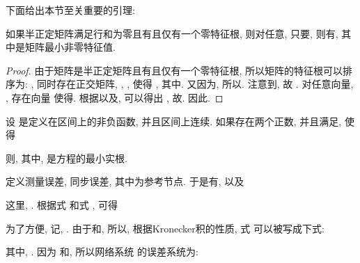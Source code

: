     下面给出本节至关重要的引理:
        \begin{lem}\label{mainlemma}
            如果半正定矩阵满足行和为零且有且仅有一个零特征根, 则对任意, 只要, 则有, 其中是矩阵最小非零特征值.
        \end{lem}
        \begin{proof}
        由于矩阵是半正定矩阵且有且仅有一个零特征根, 所以矩阵的特征根可以排序为: , 同时存在正交矩阵, , , 使得
        , 其中. 又因为, 所以. 注意到, 故 . 对任意向量, , 存在向量 使得. 根据以及, 可以得出 , 故. 因此.
        \end{proof}
        \begin{lem}[Halanay不等式]{\rm{}}\label{Halanay}
            设 是定义在区间上的非负函数, 并且区间上连续.
            如果存在两个正数, 并且满足, 使得

            则,
            其中, 是方程的最小实根.
        \end{lem}
        定义测量误差, 同步误差, 其中为参考节点.
        于是有, 以及
        \begin{comment}\label{reference}
        s(t)-s(t_k)&=\frac{1}{N}(\mathbf{1}^\top_N\otimes I_n)(x(t)-x(t_k))
        =-\frac{1}{N}(\mathbf{1}_N^\top\otimes I_n)\delta(t),
        \end{comment}
        这里, . 根据式  和式 , 可得
        \begin{comment}
        {u}_i(t)&=-\rho c\beta_i(t)\Gamma(x_i(t_k)-s(t_k))\\
        &=-\rho c\beta_i(t)\Gamma({\delta}_i(t)+x_i(t)-{s}(t)+{s}(t)-{s}(t_k))\\
        &=-\rho c\beta_i(t)\Gamma({\delta}_i(t)+e_i(t)-\frac{1}{N}(\mathbf{1}_N^\top\otimes I_n)\delta(t)).
        \end{comment}

        为了方便, 记, . 由于和, 所以, 根据Kronecker积的性质, 式  可以被写成下式:
        \begin{comment}\label{dxt}
        \nonumber \dot{x}(t)&=f(t,x(t),x(t-\tau))-c[L_{r_t}\otimes\Gamma]({\delta}(t)+e(t))\\
       &\quad-\rho c[B_t\otimes\Gamma][{\delta}(t)+e(t)-(U\otimes I_n)\delta(t)],\quad t_k\leq t<t_{k+1},
        \end{comment}
        其中, . 因为 和, 所以网络系统  的误差系统为:
        \begin{comment}\label{cee}
        \nonumber \dot{e}(t)&=\dot{x}(t)-(U\otimes I_n)\dot{x}(t)\\
        \nonumber&=f(t,x(t),x(t-\tau))-[U\otimes I_n]f(t,x(t),x(t-\tau))
        -c[L_{r_t}\otimes\Gamma]({\delta}(t)+e(t))\\
        \nonumber&\quad-\rho c[B_t\otimes\Gamma][{\delta}(t)+e(t)-(U\otimes I_n)\delta(t)]
        +\rho c[UB_t\otimes\Gamma][{\delta}(t)+e(t)-(U\otimes I_n)\delta(t)]\\
        \nonumber&=f(t,x(t),x(t-\tau))-[U\otimes I_n]f(t,x(t),x(t-\tau))
        -c[(L_{r_t}+\rho B_t-\rho UB_t)\otimes \Gamma]e(t)\\
        &\quad-c[(L_{r_t}+\rho B_t-\rho B_tU-\rho UB_t+\rho UB_tU)\otimes \Gamma]{\delta}(t),\quad t_k\leq t<t_{k+1}.
        \end{comment}
